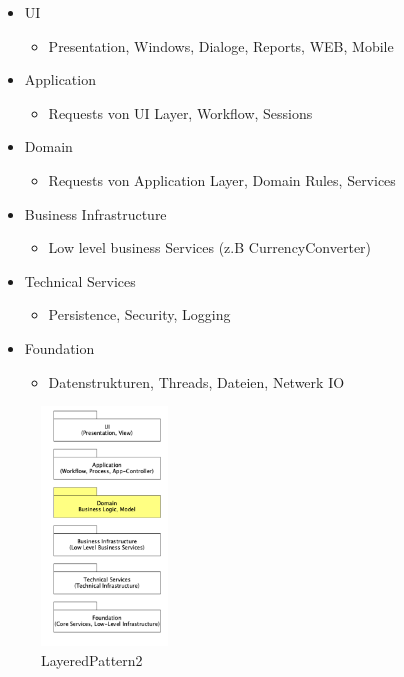 \documentclass{article}
\begin{document}
\begin{multicols}{2}
	\begin{itemize}
		\item UI
		\begin{itemize}
			\item Presentation, Windows, Dialoge, Reports, WEB, Mobile
		\end{itemize}
		\item Application
		\begin{itemize}
			\item Requests von UI Layer, Workflow, Sessions
		\end{itemize}
		\item Domain
		\begin{itemize}
			\item Requests von Application Layer, Domain Rules, Services
		\end{itemize}
		\item Business Infrastructure
		\begin{itemize}
			\item Low level business Services (z.B CurrencyConverter)
		\end{itemize}
		\item Technical Services
		\begin{itemize}
			\item Persistence, Security, Logging
		\end{itemize}
		\item Foundation
		\begin{itemize}
			\item Datenstrukturen, Threads, Dateien, Netwerk IO
		\end{itemize}
	\end{itemize}
\columnbreak

\begin{figure}[H]			\includegraphics[width=0.3\textwidth] {Resources/Images/LayeredPattern2.png}
\caption{\label{fig:LayeredPattern2}LayeredPattern2}
\end{figure}

\end{multicols}
\end{document}
